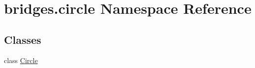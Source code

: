 \hypertarget{namespacebridges_1_1circle}{}\section{bridges.\+circle Namespace Reference}
\label{namespacebridges_1_1circle}
\subsection*{Classes}
\begin{DoxyCompactItemize}
\item 
class \hyperlink{classbridges_1_1circle_1_1_circle}{Circle}
\end{DoxyCompactItemize}
